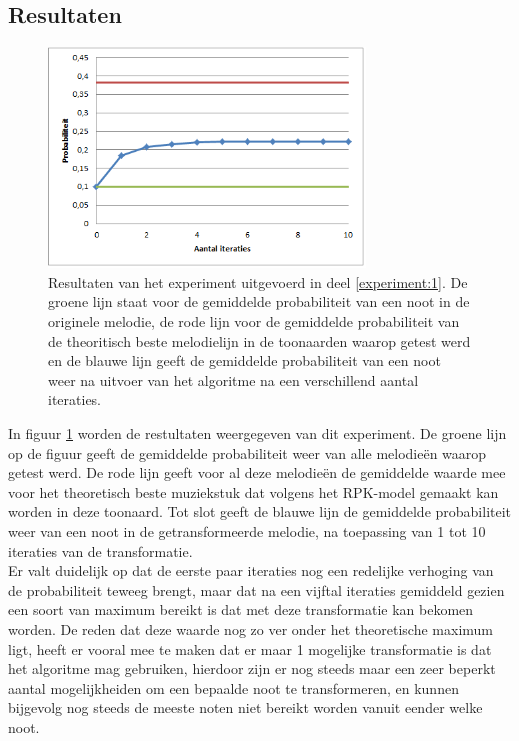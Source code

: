 \subsection{Resultaten}

\begin{figure}[!ht]
  \centering
  \includegraphics[width=0.75\textwidth]{5_Experimenten_Resultaten/exp1_res}
  \caption{Resultaten van het experiment uitgevoerd in deel \ref{experiment:1}. De groene lijn staat voor de gemiddelde probabiliteit van een noot in de originele melodie, de rode lijn voor de gemiddelde probabiliteit van de theoritisch beste melodielijn in de toonaarden waarop getest werd en de blauwe lijn geeft de gemiddelde probabiliteit van een noot weer na uitvoer van het algoritme na een verschillend aantal iteraties.}
  \label{figuur:exp1}
\end{figure}

In figuur \ref{figuur:exp1} worden de restultaten weergegeven van dit experiment. De groene lijn op de figuur geeft de gemiddelde probabiliteit weer van alle melodie\"en waarop getest werd. De rode lijn geeft voor al deze melodie\"en de gemiddelde waarde mee voor het theoretisch beste muziekstuk dat volgens het RPK-model gemaakt kan worden in deze toonaard. Tot slot geeft de blauwe lijn de gemiddelde probabiliteit weer van een noot in de getransformeerde melodie, na toepassing van 1 tot 10 iteraties van de transformatie.\\
Er valt duidelijk op dat de eerste paar iteraties nog een redelijke verhoging van de probabiliteit teweeg brengt, maar dat na een vijftal iteraties gemiddeld gezien een soort van maximum bereikt is dat met deze transformatie kan bekomen worden. De reden dat deze waarde nog zo ver onder het theoretische maximum ligt, heeft er vooral mee te maken dat er maar 1 mogelijke transformatie is dat het algoritme mag gebruiken, hierdoor zijn er nog steeds maar een zeer beperkt aantal mogelijkheiden om een bepaalde noot te transformeren, en kunnen bijgevolg nog steeds de meeste noten niet bereikt worden vanuit eender welke noot.

